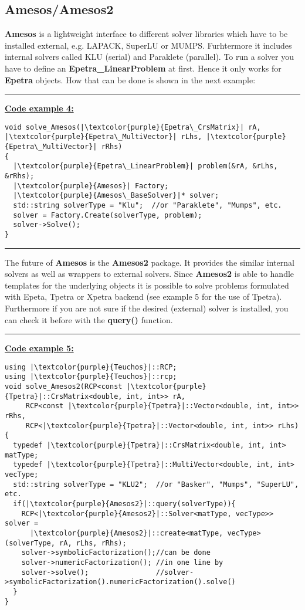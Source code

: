 \documentclass[10pt,a4paper,final,titlepage]{article}
\begin{document}
\subsection{Amesos/Amesos2}
\textbf{Amesos} is a lightweight interface to different solver libraries which have to be installed external, e.g. LAPACK, SuperLU or MUMPS. Furhtermore it includes internal solvers called KLU (serial) and Paraklete (parallel). To run a solver you have to define an \textbf{Epetra\_LinearProblem} at first. Hence it only works for \textbf{Epetra} objects. How that can be done is shown in the next example:\newline
\noindent\rule{\textwidth}{0.5pt}
\textbf{\underline{Code example 4:}}
\begin{verbatim}
void solve_Amesos(|\textcolor{purple}{Epetra\_CrsMatrix}| rA, |\textcolor{purple}{Epetra\_MultiVector}| rLhs, |\textcolor{purple}{Epetra\_MultiVector}| rRhs)
{
  |\textcolor{purple}{Epetra\_LinearProblem}| problem(&rA, &rLhs, &rRhs);
  |\textcolor{purple}{Amesos}| Factory;
  |\textcolor{purple}{Amesos\_BaseSolver}|* solver;
  std::string solverType = "Klu";  //or "Paraklete", "Mumps", etc.
  solver = Factory.Create(solverType, problem);
  solver->Solve();
}
\end{verbatim}
\noindent\rule{\textwidth}{0.5pt}
\newline \newline
The future of \textbf{Amesos} is the \textbf{Amesos2} package. It provides the similar internal solvers as well as wrappers to external solvers. Since \textbf{Amesos2} is able to handle templates for the underlying objects it is possible to solve problems formulated with Epeta, Tpetra or Xpetra backend (see example 5 for the use of Tpetra). Furthermore if you are not sure if the desired (external) solver is installed, you can check it before with the \textbf{query()} function.
\noindent\rule{\textwidth}{0.5pt}
\textbf{\underline{Code example 5:}}
\begin{verbatim}
using |\textcolor{purple}{Teuchos}|::RCP;
using |\textcolor{purple}{Teuchos}|::rcp;
void solve_Amesos2(RCP<const |\textcolor{purple}{Tpetra}|::CrsMatrix<double, int, int>> rA,
     RCP<const |\textcolor{purple}{Tpetra}|::Vector<double, int, int>> rRhs,
     RCP<|\textcolor{purple}{Tpetra}|::Vector<double, int, int>> rLhs)
{
  typedef |\textcolor{purple}{Tpetra}|::CrsMatrix<double, int, int> matType;
  typedef |\textcolor{purple}{Tpetra}|::MultiVector<double, int, int> vecType;
  std::string solverType = "KLU2";  //or "Basker", "Mumps", "SuperLU", etc.
  if(|\textcolor{purple}{Amesos2}|::query(solverType)){
    RCP<|\textcolor{purple}{Amesos2}|::Solver<matType, vecType>> solver =
      |\textcolor{purple}{Amesos2}|::create<matType, vecType>(solverType, rA, rLhs, rRhs);
    solver->symbolicFactorization();//can be done
    solver->numericFactorization(); //in one line by
    solver->solve();                //solver->symbolicFactorization().numericFactorization().solve()
  }
}
\end{verbatim}
\end{document}
